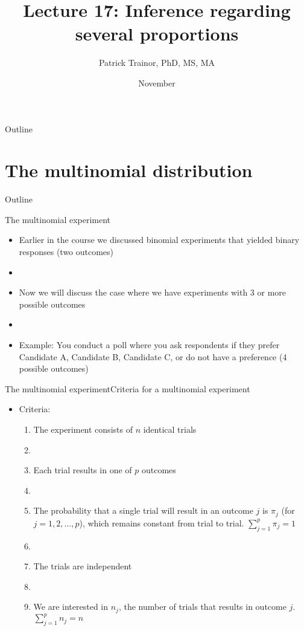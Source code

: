 \documentclass[xcolor=dvipsnames]{beamer}
\title[Lecture 17]{Lecture 17: Inference regarding several proportions}
\author[Patrick Trainor]{Patrick Trainor, PhD, MS, MA}
\institute[NMSU]{New Mexico State University}
\date{November}
\begin{document}
\begin{frame}
\maketitle
\end{frame}

\begin{frame}{Outline}
\tableofcontents[hideallsubsections]
\end{frame}

\section{The multinomial distribution}
\begin{frame}{Outline}
\tableofcontents[currentsection,subsectionstyle=show/shaded/hide]
\end{frame}

\begin{frame}{The multinomial experiment}
	\begin{itemize}
		\item Earlier in the course we discussed binomial experiments that yielded binary responses (two outcomes)
		\item[]
		\item Now we will discuss the case where we have experiments with 3 or more possible outcomes
		\item[]
		\item Example: You conduct a poll where you ask respondents if they prefer Candidate A, Candidate B, Candidate C, or do not have a preference (4 possible outcomes)
	\end{itemize}
\end{frame}

\begin{frame}{The multinomial experiment}{Criteria for a multinomial experiment}
	\begin{itemize}
		\item Criteria:
		\begin{enumerate}
			\item The experiment consists of $n$ identical trials
			\item[]
			\item Each trial results in one of $p$ outcomes
			\item[]
			\item The probability that a single trial will result in an outcome $j$ is $\pi_j$ (for $j=1, 2, \hdots, p$), which remains constant from trial to trial. $\sum_{j=1}^p \pi_j = 1$
			\item[]
			\item The trials are independent
			\item[]
			\item We are interested in $n_j$, the number of trials that results in outcome $j$. $\sum_{j=1}^p n_j = n$
		\end{enumerate}
	\end{itemize}
\end{frame}
\end{document}
